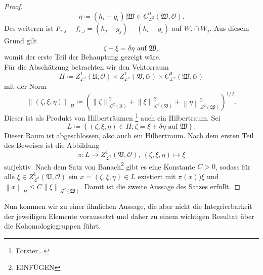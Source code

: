 \documentclass[11pt,a4paper,toc=bibliography]{scrartcl}
\theoremstyle{thm}
\theoremstyle{def}
\theoremstyle{remark}
\newcommand{\norm}[1]{\left\lVert#1\right\rVert}
\begin{document}
\begin{proof}
\[
\eta\coloneqq (h_i-g_i)|\mathfrak{W}\in C^0_{\mathcal{L}^2}(\mathfrak{W},\mathcal{O}).
\]
Des weiteren ist $F_{i,j}-f_{i,j}=(h_j-g_j)-(h_i-g_i)$ auf $W_i\cap W_j$. Aus diesem Grund gilt
\[
\zeta-\xi=\delta\eta\text{ auf }\mathfrak{W},
\]
womit der erste Teil der Behauptung gezeigt wäre.\\
Für die Abschätzung betrachten wir den Vektorraum 
\[
H\coloneqq Z^1_{\mathcal{L}^2}(\mathfrak{U},\mathcal{O})\times Z^1_{\mathcal{L}^2}(\mathfrak{V},\mathcal{O})\times C^0_{\mathcal{L}^2}(\mathfrak{W},\mathcal{O})
\]
mit der Norm
\[
\norm{(\zeta,\xi,\eta)}_{H}\coloneqq \left( \norm{\zeta}_{\mathcal{L}^2(\mathfrak{U})}^2+\norm{\xi}_{\mathcal{L}^2(\mathfrak{V})}^2+\norm{\eta}_{\mathcal{L}^2(\mathfrak{W})}^2\right)^{1/2}.
\]
Dieser ist als Produkt von Hilberträumen \footnote{Forster...} auch ein Hilbertraum. Sei 
\[
L\coloneqq\left\{ (\zeta,\xi,\eta)\in H; \zeta=\xi+\delta\eta\text{ auf } \mathfrak{W}\right\}.
\]
Dieser Raum ist abgeschlossen, also auch ein Hilbertraum. Nach dem ersten Teil des Beweises ist die Abbildung
\[
\pi:L\rightarrow Z^1_{\mathcal{L}^2}(\mathfrak{V},\mathcal{O}),~(\zeta,\xi,\eta)\mapsto \xi
\]
surjektiv. 
Nach dem Satz von Banach\footnote{EINFÜGEN} gibt es eine Konstante $C>0$, sodass für alle $\xi\in Z^1_{\mathcal{L}^2}(\mathfrak{V},\mathcal{O})$ ein $x=(\zeta,\xi,\eta)\in L$ existiert mit $\pi(x))\xi$ und $\norm{x}_H\leq C\norm{\xi}_{\mathcal{L}^2(\mathfrak{W})}$.
Damit ist die zweite Aussage des Satzes erfüllt.
\end{proof}
Nun kommen wir zu einer ähnlichen Aussage, die aber nicht die Integrierbarkeit der jeweiligen Elemente voraussetzt und daher zu einem wichtigen Resultat über die Kohomologiegruppen führt.
\end{document}
